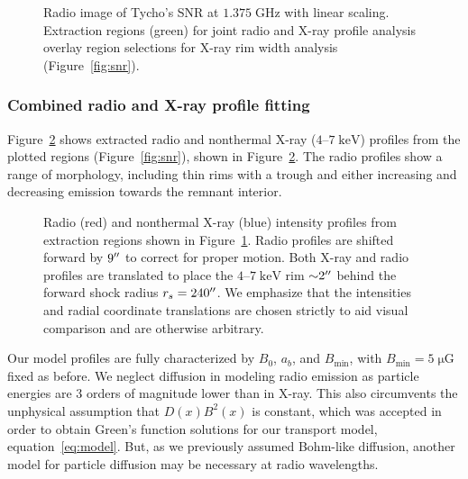 \documentclass[iop, apj, numberedappendix]{emulateapj}
\newcommand*{\mt}{\mathrm}
\newcommand*{\unit}[1]{\;\mt{#1}}  %
\newcommand*{\abt}{\mathord{\sim}} %
\newcommand*{\muG}{\unit{\mu G}}
\begin{document}
\begin{figure}
    \centering
    \caption{Radio image of Tycho's SNR at $1.375 \unit{GHz}$ with linear
    scaling.  Extraction regions (green) for joint radio and X-ray profile
    analysis overlay region selections for X-ray rim width analysis
    (Figure~\ref{fig:snr}). \label{fig:radio-snr}}
\end{figure}

\subsubsection{Combined radio and X-ray profile fitting}


Figure~\ref{fig:radio-prfs} shows extracted radio and nonthermal X-ray
($4$--$7\unit{keV}$) profiles from the plotted regions (Figure~\ref{fig:snr}),
shown in Figure~\ref{fig:radio-prfs}.  The radio profiles show a range of
morphology, including thin rims with a trough and either increasing and
decreasing emission towards the remnant interior.

\begin{figure}
    \centering
    \caption{Radio (red) and nonthermal X-ray (blue) intensity profiles from
    extraction regions shown in Figure~\ref{fig:radio-snr}.  Radio profiles are
    shifted forward by $9\mbox{$^{\prime\prime}$}$ to correct for proper motion.  Both X-ray and
    radio profiles are translated to place the $4$--$7 \unit{keV}$ rim $\abt
    2\arcsec$ behind the forward shock radius $r_s = 240\mbox{$^{\prime\prime}$}$.  We emphasize
    that the intensities and radial coordinate translations are chosen strictly
    to aid visual comparison and are otherwise arbitrary.
    \label{fig:radio-prfs}}
\end{figure}

Our model profiles are fully characterized by $B_0$, $a_b$, and $B_{\mt{min}}$,
with $B_{\mt{min}} = 5 \muG$ fixed as before.  We neglect diffusion in modeling
radio emission as particle energies are 3 orders of magnitude lower than in
X-ray.  This also circumvents the unphysical assumption that $D(x) B^2(x)$ is
constant, which was accepted in order to obtain Green's function solutions for
our transport model, equation~\eqref{eq:model}.  But, as we previously assumed
Bohm-like diffusion, another model for particle diffusion may be necessary at
radio wavelengths.
\end{document}
